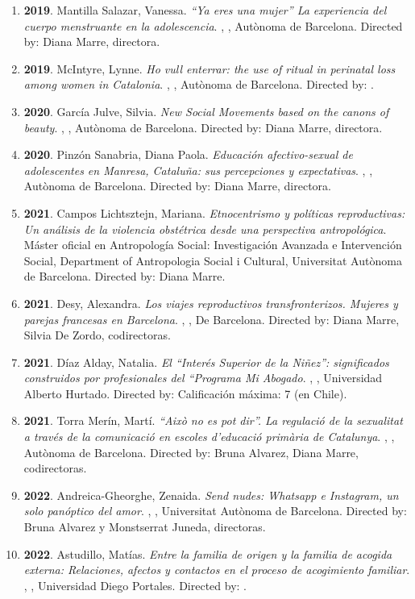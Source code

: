 \begin{enumerate}
\item {\bf 2019}. Mantilla Salazar, Vanessa. {\it “Ya eres una mujer” La experiencia del cuerpo menstruante en la adolescencia}. , , Autònoma de Barcelona. Directed by: Diana Marre, directora.\filbreak
\item {\bf 2019}. McIntyre, Lynne. {\it Ho vull enterrar: the use of ritual in perinatal loss among women in Catalonia}. , , Autònoma de Barcelona. Directed by: .\filbreak
\item {\bf 2020}. García Julve, Silvia. {\it New Social Movements based on the canons of beauty}. , , Autònoma de Barcelona. Directed by: Diana Marre, directora.\filbreak
\item {\bf 2020}. Pinzón Sanabria, Diana Paola. {\it Educación afectivo-sexual de adolescentes en Manresa, Cataluña: sus percepciones y expectativas}. , , Autònoma de Barcelona. Directed by: Diana Marre, directora.\filbreak
\item {\bf 2021}. Campos Lichtsztejn, Mariana. {\it Etnocentrismo y políticas reproductivas: Un análisis de la violencia obstétrica desde una perspectiva antropológica}. Máster oficial en Antropología Social: Investigación Avanzada e Intervención Social, Department of Antropologia Social i Cultural, Universitat Autònoma de Barcelona. Directed by: Diana Marre.\filbreak
\item {\bf 2021}. Desy, Alexandra. {\it Los viajes reproductivos transfronterizos. Mujeres y parejas francesas en Barcelona}. , , De Barcelona. Directed by: Diana Marre, Silvia De Zordo, codirectoras.\filbreak
\item {\bf 2021}. Díaz Alday, Natalia. {\it El “Interés Superior de la Niñez”: significados construidos por profesionales del “Programa Mi Abogado}. , , Universidad Alberto Hurtado. Directed by: Calificación máxima: 7 (en Chile).\filbreak
\item {\bf 2021}. Torra Merín, Martí. {\it “Això no es pot dir”. La regulació de la sexualitat a través de la comunicació en escoles d’educació primària de Catalunya}. , , Autònoma de Barcelona. Directed by: Bruna Alvarez, Diana Marre, codirectoras.\filbreak
\item {\bf 2022}. Andreica-Gheorghe, Zenaida. {\it Send nudes: Whatsapp e Instagram, un solo panóptico del amor}. , , Universitat Autònoma de Barcelona. Directed by: Bruna Alvarez y Monstserrat Juneda, directoras.\filbreak
\item {\bf 2022}. Astudillo, Matías. {\it Entre la familia de origen y la familia de acogida externa:  Relaciones, afectos y contactos en el proceso de acogimiento familiar}. , , Universidad Diego Portales. Directed by: .\filbreak

\end{enumerate}
